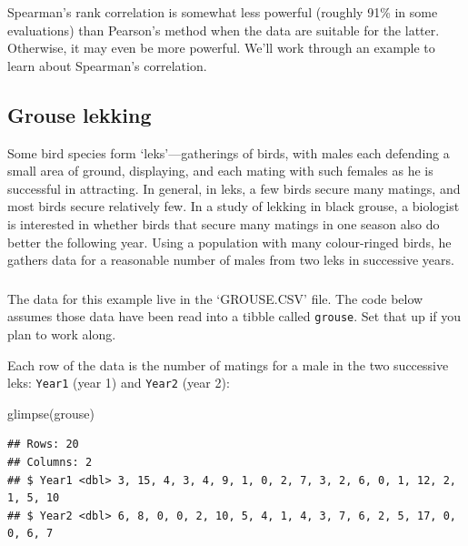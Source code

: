 \documentclass[
]{book}
\newenvironment{Shaded}{\begin{snugshade}}{\end{snugshade}}
\newcommand{\FunctionTok}[1]{\textcolor[rgb]{0.00,0.00,0.00}{#1}}
\newcommand{\NormalTok}[1]{#1}
\newenvironment{greybox}{
  \definecolor{shadecolor}{rgb}{0.95,0.95,0.95}  %
  \color{black}
  \begin{shaded}}
 {\end{shaded}}
\newenvironment{infobox}[1]
  {
  \begin{itemize}
  \renewcommand{\labelitemi}{
    \raisebox{-.7\height}[0pt][0pt]{
      {\setkeys{Gin}{width=3em,keepaspectratio}
        \texttt{[image: images/\#1]}}
    }
  }
  \setlength{\fboxsep}{1em}
  \begin{greybox}
  \item
  }
  {
  \end{greybox}
  \end{itemize}
  }
\begin{document}
Spearman's rank correlation is somewhat less powerful (roughly 91\% in some evaluations) than Pearson's method when the data are suitable for the latter. Otherwise, it may even be more powerful. We'll work through an example to learn about Spearman's correlation.

\hypertarget{grouse-lekking}{%
\subsection{Grouse lekking}\label{grouse-lekking}}

Some bird species form `leks'---gatherings of birds, with males each defending a small area of ground, displaying, and each mating with such females as he is successful in attracting. In general, in leks, a few birds secure many matings, and most birds secure relatively few. In a study of lekking in black grouse, a biologist is interested in whether birds that secure many matings in one season also do better the following year. Using a population with many colour-ringed birds, he gathers data for a reasonable number of males from two leks in successive years.

\begin{infobox}{action}

\hypertarget{section-22}{%
\subsubsection*{}\label{section-22}}

The data for this example live in the `GROUSE.CSV' file. The code below assumes those data have been read into a tibble called \texttt{grouse}. Set that up if you plan to work along.

\end{infobox}

Each row of the data is the number of matings for a male in the two successive leks: \texttt{Year1} (year 1) and \texttt{Year2} (year 2):

\begin{Shaded}
\begin{Highlighting}[]
\FunctionTok{glimpse}\NormalTok{(grouse)}
\end{Highlighting}
\end{Shaded}

\begin{verbatim}
## Rows: 20
## Columns: 2
## $ Year1 <dbl> 3, 15, 4, 3, 4, 9, 1, 0, 2, 7, 3, 2, 6, 0, 1, 12, 2, 1, 5, 10
## $ Year2 <dbl> 6, 8, 0, 0, 2, 10, 5, 4, 1, 4, 3, 7, 6, 2, 5, 17, 0, 0, 6, 7
\end{verbatim}
\end{document}
